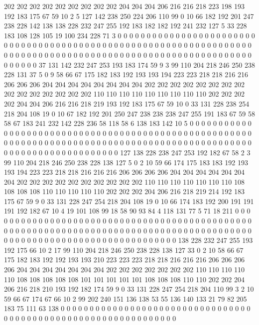 202 202 202 202 202 202 202 202 202 204 204 204 206 216 216 218 223 198 193 192
183 175 67 59 10 2 5 127 142 238 250 224 206 110 99 0 10 66 182 192
201 247 238 228 142 138 138 228 232 247 255 192 183 182 182 192 241 232 127 5
33 228 183 108 128 105 19 100 234 228 71 3 0 0 0 0 0 0 0 0
0 0 0 0 0 0 0 0 0 0 0 0 0 0 0 0 0 0 0 0
0 0 0 0 0 0 0 0 0 0 0 0 0 0 0 0 0 0 0 0
0 0 0 0 0 0 0 0 0 0 0 0 0 0 0 0 0 0 0 0
0 0 0 0 0 0 0 0 0 0 0 0 0 0 0 0 0 0 0 0
0 0 0 0 0 0 0 0 0 0 0 0 0 0 0 0 0 0 0 0
0 0 0 0 0 0 0 0 37 131 142 232 247 253 193 183 174 59 9 3
99 110 204 218 246 250 238 228 131 37 5 0 9 58 66 67 175 182 183 192
193 193 194 223 223 218 218 216 216 206 206 206 204 204 204 204 204 204 204 204
202 202 202 202 202 202 202 202 202 202 202 202 202 202 202 110 110 110 110 110
110 110 110 110 202 202 202 202 204 204 206 216 216 218 219 193 192 183 175 67
59 10 0 33 131 228 238 254 218 204 108 19 0 10 67 182 192 201 250 247
238 238 238 247 255 191 183 67 59 58 58 67 183 241 232 142 228 236 58 118
58 6 138 183 142 10 5 0 0 0 0 0 0 0 0 0 0 0 0 0
0 0 0 0 0 0 0 0 0 0 0 0 0 0 0 0 0 0 0 0
0 0 0 0 0 0 0 0 0 0 0 0 0 0 0 0 0 0 0 0
0 0 0 0 0 0 0 0 0 0 0 0 0 0 0 0 0 0 0 0
0 0 0 0 0 0 0 0 0 0 0 0 0 0 0 0 0 0 0 0
0 0 0 0 0 0 0 0 0 0 0 0 0 0 0 0 0 0 0 0
0 0 0 0 127 138 228 238 247 253 192 182 67 58 2 3 99 110 204 218
246 250 238 228 138 127 5 0 2 10 59 66 174 175 183 183 192 193 193 194
223 223 218 218 216 216 216 206 206 206 206 204 204 204 204 204 204 204 202 202
202 202 202 202 202 202 202 202 110 110 110 110 110 110 110 108 108 108 108 110
110 110 110 110 202 202 202 204 206 216 218 219 214 192 183 175 67 59 9 0
33 131 228 247 254 218 204 108 19 0 10 66 174 183 192 200 191 191 191 192
182 67 10 4 19 101 108 99 18 58 90 93 84 4 118 131 77 5 71 18
211 0 0 0 0 0 0 0 0 0 0 0 0 0 0 0 0 0 0 0
0 0 0 0 0 0 0 0 0 0 0 0 0 0 0 0 0 0 0 0
0 0 0 0 0 0 0 0 0 0 0 0 0 0 0 0 0 0 0 0
0 0 0 0 0 0 0 0 0 0 0 0 0 0 0 0 0 0 0 0
0 0 0 0 0 0 0 0 0 0 0 0 0 0 0 0 0 0 0 0
0 0 0 0 0 0 0 0 0 0 0 0 0 0 0 0 0 0 0 0
138 228 232 247 255 193 192 175 66 10 2 17 99 110 204 218 246 250 238 228
138 127 33 0 2 10 58 66 67 175 182 183 192 192 193 193 210 223 223 223
218 218 216 216 216 206 206 206 206 204 204 204 204 204 204 204 202 202 202 202
202 202 202 110 110 110 110 110 108 108 108 108 108 101 101 101 101 101 108 108
108 110 110 202 202 204 206 216 218 210 193 192 182 174 59 9 0 33 131 228
247 254 218 204 110 99 3 2 10 59 66 67 174 67 66 10 2 99 202 240
151 136 138 53 55 136 140 133 21 79 82 205 183 75 111 63 138 0 0 0
0 0 0 0 0 0 0 0 0 0 0 0 0 0 0 0 0 0 0 0
0 0 0 0 0 0 0 0 0 0 0 0 0 0 0 0 0 0 0 0
0 0 0 0 0 0 0 0 0 0 0 0 0 0 0 0 0 0 0 0
